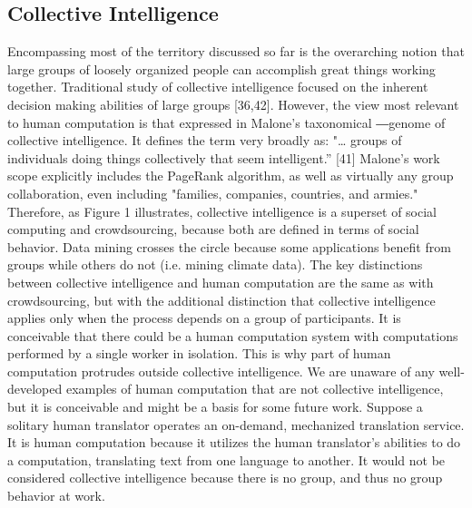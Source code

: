 \documentclass{sig-alternate}
\begin{document}
\subsection*{Collective Intelligence}
Encompassing most of the territory discussed so far is the overarching notion that large groups of loosely organized people can accomplish great things working together. Traditional study of collective intelligence focused on the inherent decision making abilities of large groups [36,42]. However, the view most relevant to human computation is that expressed in Malone’s taxonomical ―genome of collective intelligence. It defines the term very broadly as:
"… groups of individuals doing things collectively that seem intelligent.” [41]
Malone’s work scope explicitly includes the PageRank algorithm, as well as virtually any group collaboration, even including "families, companies, countries, and armies." Therefore, as Figure 1 illustrates, collective intelligence is a superset of social computing and crowdsourcing, because both are defined in terms of social behavior. Data mining crosses the circle because some applications benefit from groups while others do not (i.e. mining climate data).
The key distinctions between collective intelligence and human computation are the same as with crowdsourcing, but with the additional distinction that collective intelligence applies only when the process depends on a group of participants. It is conceivable that there could be a human computation system with computations performed by a single worker in isolation. This is why part of human computation protrudes outside collective intelligence.
We are unaware of any well-developed examples of human computation that are not collective intelligence, but it is conceivable and might be a basis for some future work. Suppose a solitary human translator operates an on-demand, mechanized translation service. It is human computation because it utilizes the human translator’s abilities to do a computation, translating text from one language to another. It would not be considered collective intelligence because there is no group, and thus no group behavior at work.
\end{document}
